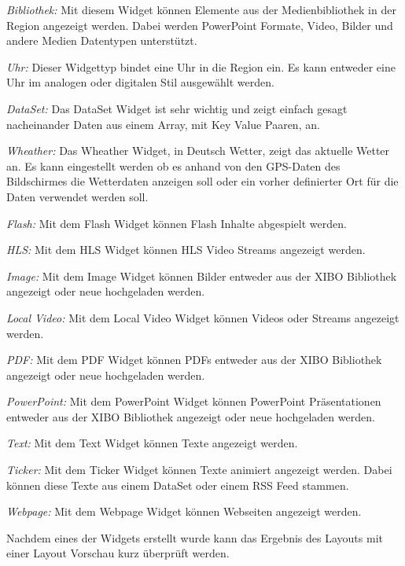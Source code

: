 \begin{widgettypes}
	\item {\em Bibliothek:} Mit diesem Widget können Elemente aus der Medienbibliothek in der Region angezeigt werden. Dabei werden PowerPoint Formate, Video, Bilder und andere Medien Datentypen unterstützt.
	
	\item {\em Uhr:} 
	Dieser Widgettyp bindet eine Uhr in die Region ein. Es kann entweder eine Uhr im analogen oder digitalen Stil ausgewählt werden.
	
	\item {\em DataSet:} 
	Das DataSet Widget ist sehr wichtig und zeigt einfach gesagt nacheinander Daten aus einem Array, mit Key Value Paaren, an.
	
	\item {\em Wheather:} 
	Das Wheather Widget, in Deutsch Wetter, zeigt das aktuelle Wetter an. Es kann eingestellt werden ob es anhand von den GPS-Daten des Bildschirmes die Wetterdaten anzeigen soll oder ein vorher definierter Ort für die Daten verwendet werden soll.
	
	\item {\em Flash:} 
	Mit dem Flash Widget können Flash Inhalte abgespielt werden.
	
	\item {\em HLS:} 
	Mit dem HLS Widget können HLS Video Streams angezeigt werden.
	
	\item {\em Image:} 
	Mit dem Image Widget können Bilder entweder aus der XIBO Bibliothek angezeigt oder neue hochgeladen werden.
	
	\item {\em Local Video:} 
	Mit dem Local Video Widget können Videos oder Streams angezeigt werden.
	
	\item {\em PDF:} 
	Mit dem PDF Widget können PDFs entweder aus der XIBO Bibliothek angezeigt oder neue hochgeladen werden.
	
	\item {\em PowerPoint:} 
	Mit dem PowerPoint Widget können PowerPoint Präsentationen entweder aus der XIBO Bibliothek angezeigt oder neue hochgeladen werden.

	\item {\em Text:} 
	Mit dem Text Widget können Texte angezeigt werden.
	
	\item {\em Ticker:} 
	Mit dem Ticker Widget können Texte animiert angezeigt werden. Dabei können diese Texte aus einem DataSet oder einem RSS Feed stammen.
	
	\item {\em Webpage:} 
	Mit dem Webpage Widget können Webseiten angezeigt werden.
\end{widgettypes}

Nachdem eines der Widgets erstellt wurde kann das Ergebnis des Layouts mit einer Layout Vorschau kurz überprüft werden.
